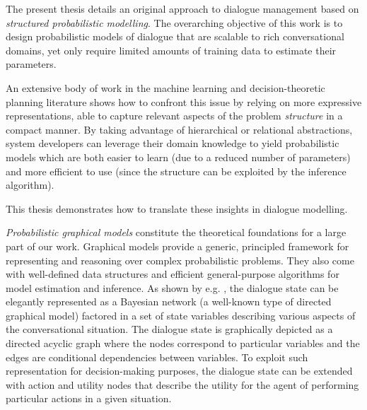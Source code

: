 The present thesis details an original approach to dialogue management based on \textit{structured probabilistic modelling}.  The overarching objective of this work is to design probabilistic models of dialogue that are scalable to rich conversational domains, yet only require limited amounts of training data to estimate their parameters.

An extensive body of work in the machine learning and decision-theoretic planning literature shows how to confront this issue by relying on more expressive representations, able to capture relevant aspects of the problem \textit{structure} in a compact manner. By taking advantage of hierarchical or relational abstractions, system developers can leverage their domain knowledge to yield probabilistic models which are both easier to learn (due to a reduced number of parameters) and more efficient to use (since the structure can be exploited by the inference algorithm).  

This thesis demonstrates how to translate these insights in dialogue modelling. 

\textit{Probabilistic graphical models} \citep{Koller+Friedman:09} constitute the theoretical foundations for a large part of our work.  Graphical models provide a generic, principled framework for representing and reasoning over complex probabilistic problems. They also come with well-defined data structures and efficient general-purpose algorithms for model estimation and inference.  As shown  by e.g. \cite{Thomson:2010:BUD:1772996.1773040}, the dialogue state can be elegantly represented as a Bayesian network (a well-known type of directed graphical model) factored in a set of state variables describing various aspects of the conversational situation.  The dialogue state is graphically depicted as a directed acyclic graph where the nodes correspond to particular variables and the edges are conditional dependencies between variables. To exploit such representation for decision-making purposes, the dialogue state can be extended with action and utility nodes that describe the utility for the agent of performing particular actions in a given situation. 

